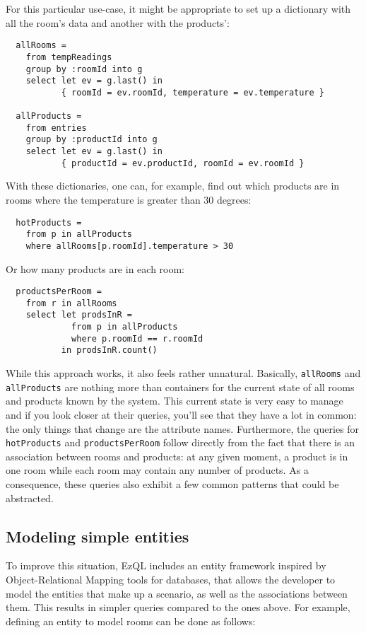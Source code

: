 \documentclass[a4,11pt]{report}
\begin{document}
For this particular use-case, it might be appropriate to set up a
dictionary with all the room's data and another with the products':

\begin{lstlisting}
  allRooms =
    from tempReadings
    group by :roomId into g
    select let ev = g.last() in
           { roomId = ev.roomId, temperature = ev.temperature }

  allProducts =
    from entries
    group by :productId into g
    select let ev = g.last() in
           { productId = ev.productId, roomId = ev.roomId }
\end{lstlisting}

With these dictionaries, one can, for example, find out which products
are in rooms where the temperature is greater than 30 degrees:

\begin{lstlisting}
  hotProducts =
    from p in allProducts
    where allRooms[p.roomId].temperature > 30
\end{lstlisting}

Or how many products are in each room:

\begin{lstlisting}
  productsPerRoom =
    from r in allRooms
    select let prodsInR =
             from p in allProducts
             where p.roomId == r.roomId
           in prodsInR.count()
\end{lstlisting}

While this approach works, it also feels rather unnatural. Basically,
\verb=allRooms= and \verb=allProducts= are nothing more than
containers for the current state of all rooms and products known by
the system. This current state is very easy to manage and if you look
closer at their queries, you'll see that they have a lot in common:
the only things that change are the attribute names. Furthermore, the
queries for \verb=hotProducts= and \verb=productsPerRoom= follow
directly from the fact that there is an association between rooms and
products: at any given moment, a product is in one room while each
room may contain any number of products. As a consequence, these
queries also exhibit a few common patterns that could be abstracted.

\subsection{Modeling simple entities}

To improve this situation, EzQL includes an entity framework inspired
by Object-Relational Mapping tools for databases, that allows the
developer to model the entities that make up a scenario, as well as
the associations between them. This results in simpler queries
compared to the ones above. For example, defining an entity to model
rooms can be done as follows:
\end{document}
